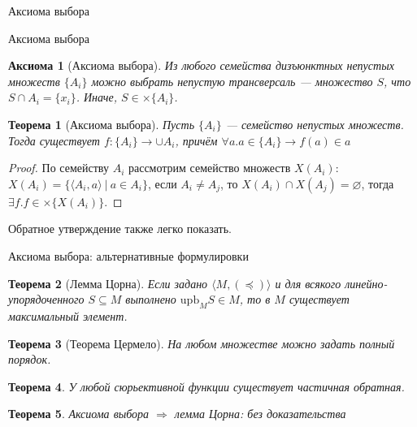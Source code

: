 \documentclass[aspectratio=169]{beamer}
\newtheorem{thm}{Теорема}[section]
\newtheorem{axm}{Аксиома}[section]
\begin{document}
\newcommand\doubleplus{+\kern-1.3ex+\kern0.8ex}
\newcommand\mdoubleplus{\ensuremath{\mathbin{+\mkern-10mu+}}}

\begin{frame}
\begin{center}\LARGE Аксиома выбора \end{center}
\end{frame}


\begin{frame}{Аксиома выбора}
\begin{axm}[Аксиома выбора]
Из любого семейства дизъюнктных непустых множеств $\{A_i\}$ можно выбрать непустую трансверсаль --- 
множество $S$, что $S \cap A_i = \{ x_i \}$. Иначе, $S \in \times \{A_i\}$.
\end{axm}

\begin{thm}[Аксиома выбора]
Пусть $\{A_i\}$ --- семейство непустых множеств. Тогда существует
$f : \{A_i\} \rightarrow \cup A_i$, причём $\forall a.a \in \{A_i\} \rightarrow f(a) \in a$
\end{thm}

\begin{proof}По семейству $A_i$ рассмотрим семейство множеств $X(A_i)$:
$X(A_i) = \{ \langle A_i, a \rangle \ |\ a \in A_i \}$, если $A_i \ne A_j$, то $X(A_i) \cap X(A_j) = \varnothing$,
тогда $\exists f.f \in \times \{ X(A_i) \}$.
\end{proof}
Обратное утверждение также легко показать.
\end{frame}

\begin{frame}{Аксиома выбора: альтернативные формулировки}
\begin{thm}[Лемма Цорна]
Если задано $\langle M, (\preceq) \rangle$ и для всякого линейно-упорядоченного $S \subseteq M$ выполнено
$\text{upb}_M S \in M$, то в $M$ существует максимальный элемент.
\end{thm}
\begin{thm}[Теорема Цермело]
На любом множестве можно задать полный порядок.
\end{thm}
\begin{thm}
У любой сюрьективной функции существует частичная обратная.
\end{thm}

\begin{thm}
Аксиома выбора $\Rightarrow$ лемма Цорна: без доказательства
\end{thm}
\end{frame}
\end{document}
